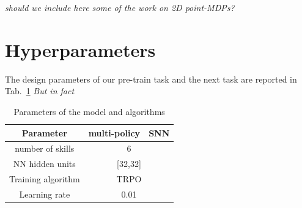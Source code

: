 \documentclass{article} %
\begin{document}
\textit{should we include here some of the work on 2D point-MDPs?}



\appendix
\section{Hyperparameters}
The design parameters of our pre-train task and the next task are reported in Tab.\ \ref{tab:params} \textit{But in fact}

\begin{table}
\centering
\begin{tabular}[t]{c|cc}
Parameter & multi-policy & SNN \\
\hline
number of skills & \multicolumn{2}{c}{6}\\
NN hidden units & \multicolumn{2}{c}{[32,32]}\\
Training algorithm & \multicolumn{2}{c}{TRPO}\\
Learning rate & \multicolumn{2}{c}{0.01}\\
\end{tabular}
\caption{Parameters of the model and algorithms}
\label{tab:params}
\end{table}
\end{document}
